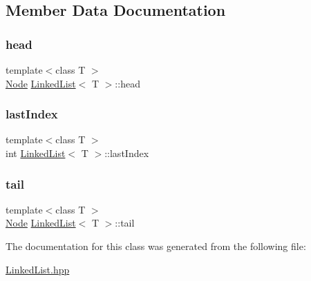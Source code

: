 \subsection{Member Data Documentation}
\mbox{\label{class_linked_list_ab988fa5b90980a11bbe3ccb260c1de40}} 
\subsubsection{\texorpdfstring{head}{head}}
{\footnotesize\ttfamily template$<$class T $>$ \\
\hyperlink{class_linked_list_a58a054a6f1b73397efedc0428d2e7804}{Node} \hyperlink{class_linked_list}{Linked\+List}$<$ T $>$\+::head\hspace{0.3cm}{\ttfamily [protected]}}

\mbox{\label{class_linked_list_ac4d966cb83192e9d8d11084e3436939c}} 
\subsubsection{\texorpdfstring{last\+Index}{lastIndex}}
{\footnotesize\ttfamily template$<$class T $>$ \\
int \hyperlink{class_linked_list}{Linked\+List}$<$ T $>$\+::last\+Index\hspace{0.3cm}{\ttfamily [protected]}}

\mbox{\label{class_linked_list_a130cacd1659d0ccda25b90620a46599f}} 
\subsubsection{\texorpdfstring{tail}{tail}}
{\footnotesize\ttfamily template$<$class T $>$ \\
\hyperlink{class_linked_list_a58a054a6f1b73397efedc0428d2e7804}{Node} \hyperlink{class_linked_list}{Linked\+List}$<$ T $>$\+::tail\hspace{0.3cm}{\ttfamily [protected]}}



The documentation for this class was generated from the following file\+:\begin{DoxyCompactItemize}
\item 
\hyperlink{_linked_list_8hpp}{Linked\+List.\+hpp}\end{DoxyCompactItemize}
